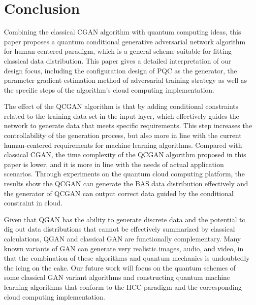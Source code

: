 \documentclass{bmcart}
\begin{document}
\section{Conclusion}
Combining the classical CGAN algorithm with quantum computing ideas, this paper proposes a quantum conditional generative adversarial network algorithm for human-centered paradigm, which is a general scheme suitable for fitting classical data distribution. This paper gives a detailed interpretation of our design focus, including the configuration design of PQC as the generator, the parameter gradient estimation method of adversarial training strategy as well as the specific steps of the algorithm's cloud computing implementation.

The effect of the QCGAN algorithm is that by adding conditional constraints related to the training data set in the input layer, which effectively guides the network to generate data that meets specific requirements. This step increases the controllability of the generation process, but also more in line with the current human-centered requirements for machine learning algorithms. Compared with classical CGAN, the time complexity of the QCGAN algorithm proposed in this paper is lower, and it is more in line with the needs of actual application scenarios. Through experiments on the quantum cloud computing platform, the results show the QCGAN can generate the BAS data distribution effectively and the generator of QCGAN can output correct data guided by the conditional constraint in cloud.


Given that QGAN has the ability to generate discrete data and the potential to dig out data distributions that cannot be effectively summarized by classical calculations, QGAN and classical GAN are functionally complementary. Many known variants of GAN can generate very realistic images, audio, and video, in that the combination of these algorithms and quantum mechanics is undoubtedly the icing on the cake. Our future work will focus on the quantum schemes of some classical GAN variant algorithms and constructing quantum machine learning algorithms that conform to the HCC paradigm and the corresponding cloud computing implementation.


\end{document}
